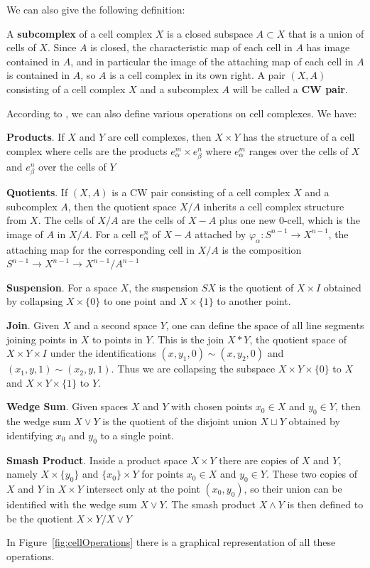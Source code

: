 We can also give the following definition:

\begin{definition}[Subcomplex]
A \textbf{subcomplex} of a cell complex $X$ is a closed subspace $A \subset X$ that is a union of cells of $X$. Since $A$ is closed, the characteristic map of each cell in $A$ has image contained in $A$, and in particular the image of the attaching map of each cell in $A$ is contained in $A$, so $A$ is a cell complex in its own right. A pair $(X,A)$ consisting of a cell complex $X$ and a subcomplex $A$ will be called a \textbf{CW pair}.
\end{definition}

According to \cite{Hatcher}, we can also define various operations on cell complexes. We have:
\begin{description}
 \item \textbf{Products}. If $X$ and $Y$ are cell complexes, then $X \times Y$ has the structure of a cell complex where cells are the products $e^{m}_{\alpha} \times e^{n}_{\beta}$ where $e^{m}_{\alpha}$ ranges over the cells of $X$ and $e^{n}_{\beta}$ over the cells of $Y$
 \item \textbf{Quotients}.  If $(X, A)$ is a CW pair consisting of a cell complex $X$ and a subcomplex $A$, then the quotient space $X/A$ inherits a cell complex structure from $X$. The cells of $X/A$ are the cells of $X - A$ plus one new 0-cell, which is the image of $A$ in $X/A$. For a cell $e^{n}_{\alpha}$ of $X-A$ attached by $\varphi_{\alpha} \colon S^{n-1} \rightarrow X^{n-1}$, the attaching map for the corresponding cell in $X/A$ is the composition $S^{n-1} \rightarrow X^{n-1} \rightarrow X^{n-1}/A^{n-1}$
 \item \textbf{Suspension}. For a space $X$, the suspension $SX$ is the quotient of $X \times I$ obtained by collapsing $X \times \{0\}$ to one point and $X \times \{1\}$ to another point.
 \item \textbf{Join}. Given $X$ and a second space $Y$, one can define the space of all line segments joining points in $X$ to points in $Y$. This is the join $X \ast Y$, the quotient space of $X \times Y \times I$ under the identifications $(x, y_{1}, 0) \sim (x, y_{2}, 0)$ and $(x_{1}, y, 1) \sim (x_{2}, y, 1)$. Thus we are collapsing the subspace $X \times Y \times \{0\}$ to $X$ and $X \times Y \times \{1\}$ to $Y$.
 \item \textbf{Wedge Sum}. Given spaces $X$ and $Y$ with chosen points $x_{0} \in X$ and $y_{0} \in Y$, then the wedge sum $X \vee Y$ is the quotient of the disjoint union $X \sqcup Y$ obtained by identifying $x_{0}$ and $y_{0}$ to a single point.
 \item \textbf{Smash Product}. Inside a product space $X \times Y$ there are copies of $X$ and $Y$, namely $X \times \{y_{0}\}$ and $\{x_{0}\} \times Y$ for points $x_{0} \in X$ and $y_{0} \in Y$. These two copies of $X$ and $Y$ in $X \times Y$ intersect only at the point $(x_{0}, y_{0})$, so their union can be identified with the wedge sum $X \vee Y$. The smash product $X \wedge Y$ is then defined to be the quotient $X \times Y/X \vee Y$
\end{description}
In Figure~\ref{fig:cellOperations} there is a graphical representation of all these operations.

